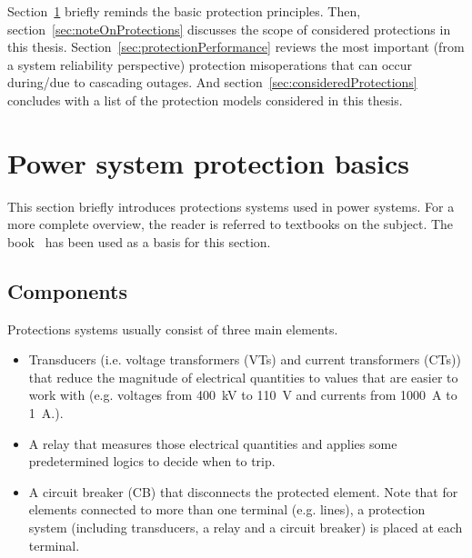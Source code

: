 Section~\ref{sec:protectionBasics} briefly reminds the basic protection principles. Then, section~\ref{sec:noteOnProtections} discusses the scope of considered protections in this thesis. Section~\ref{sec:protectionPerformance} reviews the most important (from a system reliability perspective) protection misoperations that can occur during/due to cascading outages. And section~\ref{sec:consideredProtections} concludes with a list of the protection models considered in this thesis.


\section{Power system protection basics}
\label{sec:protectionBasics}


This section briefly introduces protections systems used in power systems. For a more complete overview, the reader is referred to textbooks on the subject. The book~\cite{HorowitzBook} has been used as a basis for this section.

\subsection{Components}

Protections systems usually consist of three main elements.

\begin{itemize}
    \item Transducers (i.e. voltage transformers (VTs) and current transformers (CTs)) that reduce the magnitude of electrical quantities to values that are easier to work with (e.g. voltages from 400~kV to 110~V and currents from 1000~A to 1~A.).
    \item A relay that measures those electrical quantities and applies some predetermined logics to decide when to trip.
    \item A circuit breaker (CB) that disconnects the protected element. Note that for elements connected to more than one terminal (e.g. lines), a protection system (including transducers, a relay and a circuit breaker) is placed at each terminal.
\end{itemize}

